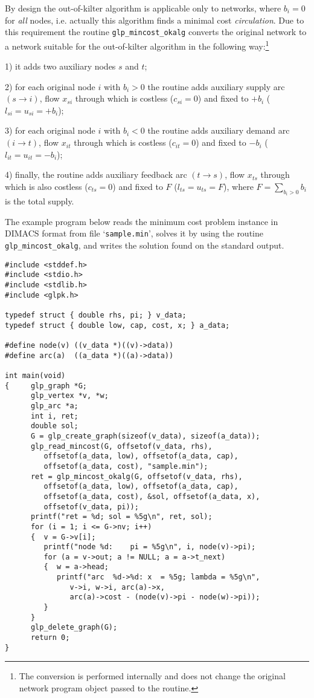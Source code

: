 \documentclass[11pt]{report}
\def\para#1{\noindent{\bf#1}}
\begin{document}
By design the out-of-kilter algorithm is applicable only to networks,
where $b_i=0$ for {\it all} nodes, i.e. actually this algorithm finds a
minimal cost {\it circulation}. Due to this requirement the routine
\verb|glp_mincost_okalg| converts the original network to a network
suitable for the out-of-kilter algorithm in the following
way:\footnote{The conversion is performed internally and does not change
the original network program object passed to the routine.}

1) it adds two auxiliary nodes $s$ and $t$;

2) for each original node $i$ with $b_i>0$ the routine adds auxiliary
supply arc $(s\rightarrow i)$, flow $x_{si}$ through which is costless
($c_{si}=0$) and fixed to $+b_i$ ($l_{si}=u_{si}=+b_i$);

3) for each original node $i$ with $b_i<0$ the routine adds auxiliary
demand arc $(i\rightarrow t)$, flow $x_{it}$ through which is costless
($c_{it}=0$) and fixed to $-b_i$ ($l_{it}=u_{it}=-b_i$);

4) finally, the routine adds auxiliary feedback arc $(t\rightarrow s)$,
flow $x_{ts}$ through which is also costless ($c_{ts}=0$) and fixed to
$F$ ($l_{ts}=u_{ts}=F$), where $\displaystyle F=\sum_{b_i>0}b_i$ is the
total supply.

\newpage

\para{Example}

The example program below reads the minimum cost problem instance in
DIMACS format from file `\verb|sample.min|', solves it by using the
routine \verb|glp_mincost_okalg|, and writes the solution found on the
standard output.

\begin{footnotesize}
\begin{verbatim}
#include <stddef.h>
#include <stdio.h>
#include <stdlib.h>
#include <glpk.h>

typedef struct { double rhs, pi; } v_data;
typedef struct { double low, cap, cost, x; } a_data;

#define node(v) ((v_data *)((v)->data))
#define arc(a)  ((a_data *)((a)->data))

int main(void)
{     glp_graph *G;
      glp_vertex *v, *w;
      glp_arc *a;
      int i, ret;
      double sol;
      G = glp_create_graph(sizeof(v_data), sizeof(a_data));
      glp_read_mincost(G, offsetof(v_data, rhs),
         offsetof(a_data, low), offsetof(a_data, cap),
         offsetof(a_data, cost), "sample.min");
      ret = glp_mincost_okalg(G, offsetof(v_data, rhs),
         offsetof(a_data, low), offsetof(a_data, cap),
         offsetof(a_data, cost), &sol, offsetof(a_data, x),
         offsetof(v_data, pi));
      printf("ret = %d; sol = %5g\n", ret, sol);
      for (i = 1; i <= G->nv; i++)
      {  v = G->v[i];
         printf("node %d:    pi = %5g\n", i, node(v)->pi);
         for (a = v->out; a != NULL; a = a->t_next)
         {  w = a->head;
            printf("arc  %d->%d: x  = %5g; lambda = %5g\n",
               v->i, w->i, arc(a)->x,
               arc(a)->cost - (node(v)->pi - node(w)->pi));
         }
      }
      glp_delete_graph(G);
      return 0;
}
\end{verbatim}
\end{footnotesize}
\end{document}
